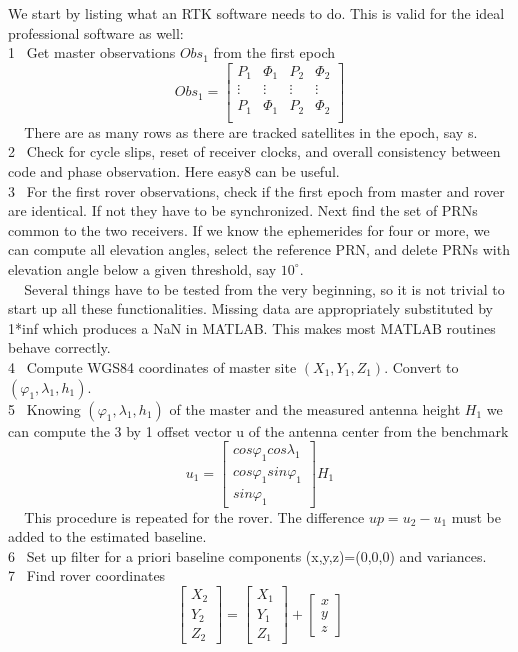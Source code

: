 We start by listing what an RTK software needs to do. This is valid for the ideal professional software as well:\\
1\,\,\,\,\,Get master observations $Obs_{1}$ from the first epoch
$$
Obs_{1}=
\begin{bmatrix}
P_{1}&\Phi_{1}&P_{2}&\Phi_{2}\\
\vdots&\vdots&\vdots&\vdots\\
P_{1}&\Phi_{1}&P_{2}&\Phi_{2}\\
\end{bmatrix}
$$
\,\,\,\,\,\,\,There are as many rows as there are tracked satellites in the epoch, say s.\\
2\,\,\,\,\,Check for cycle slips, reset of receiver clocks, and overall consistency between code
and phase observation. Here easy8 can be useful.\\
3\,\,\,\,\,For the first rover observations, check if the first epoch from master and rover are
identical. If not they have to be synchronized. Next find the set of PRNs common to the two receivers. If we know the ephemerides for four or more, we can compute all elevation angles, select
the reference PRN, and delete PRNs with elevation angle below a given threshold, say $10^{\circ}$.\\
\,\,\,\,\,\,\,Several things have to be tested from the very beginning, so it is not trivial to start   up all these functionalities. Missing data are appropriately substituted by 1*inf which
produces a NaN in MATLAB. This makes most MATLAB routines behave correctly.\\
4\,\,\,\,\,Compute WGS84 coordinates of master site $(X_{1},Y_{1},Z_{1})$. Convert to $(\varphi_{1},\lambda_{1},h_{1})$.\\
5\,\,\,\,\,Knowing $(\varphi_{1},\lambda_{1},h_{1})$ of the master and the measured antenna height $H_{1}$ we can compute the 3 by 1 offset vector u of the antenna center from the benchmark
$$
u_{1}=
\begin{bmatrix}
cos\varphi_{1}cos\lambda_{1}\\
cos\varphi_{1}sin\varphi_{1}\\
sin\varphi_{1}
\end{bmatrix}
H_{1}
$$
\,\,\,\,\,\,\,This procedure is repeated for the rover. The difference $up=u_{2}-u_{1}$ must be added to the estimated baseline.\\
6\,\,\,\,\,Set up filter for a priori baseline components (x,y,z)=(0,0,0) and variances.\\
7\,\,\,\,\,Find rover coordinates
$$
\begin{bmatrix}
X_{2}\\Y_{2}\\Z_{2}
\end{bmatrix}
=
\begin{bmatrix}
X_{1}\\Y_{1}\\Z_{1}
\end{bmatrix}
+
\begin{bmatrix}
x\\y\\z
\end{bmatrix}
$$
